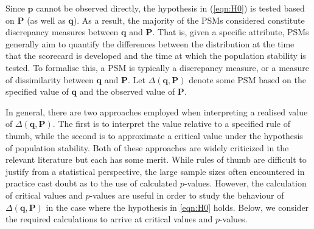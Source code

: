 \documentclass{article}
\theoremstyle{def}
\begin{document}
Since $\mathbf{p}$ cannot be observed directly, the hypothesis in (\ref{eqn:H0}) is tested based on $\mathbf{P}$ (as well as $\mathbf{q}$). As a result, the majority of the PSMs considered constitute discrepancy measures between $\mathbf{q}$ and $\mathbf{P}$.
That is, given a specific attribute, PSMs generally aim to quantify the differences between the distribution at the time that the scorecard is developed and the time at which the population stability is tested. To formalise this, a PSM is typically a discrepancy measure, or a measure of dissimilarity between $\mathbf{q}$ and $\mathbf{P}$. Let $\Delta(\mathbf{q},\mathbf{P})$ denote some PSM based on the specified value of $\mathbf{q}$ and the observed value of $\mathbf{P}$.

In general, there are two approaches employed when interpreting a realised value of $\Delta(\mathbf{q},\mathbf{P})$. The first is to interpret the value relative to a specified rule of thumb, while the second is to approximate a critical value under the hypothesis of population stability. Both of these approaches are widely criticized in the relevant literature but each has some merit. While rules of thumb are difficult to justify from a statistical perspective, the large sample sizes often encountered in practice cast doubt as to the use of calculated $p$-values. However, the calculation of critical values and $p$-values are useful in order to study the behaviour of $\Delta(\mathbf{q},\mathbf{P})$ in the case where the hypothesis in \eqref{eqn:H0} holds. Below, we consider the required calculations to arrive at critical values and $p$-values.
\end{document}
